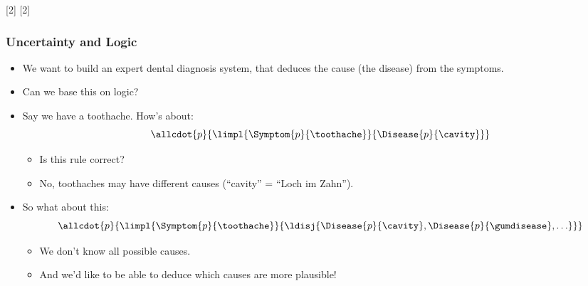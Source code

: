 \documentclass[notes,mh]{mikoslides}
\begin{document}
\begin{module}[id=uncert-logic]
[2]{\prefix{}}
[2]{\prefix{}}
 

\begin{frame}[label=slide.uncert-logic]
  \frametitle{Uncertainty and Logic}
  \begin{itemize}
  \item
    \begin{omtext}[title=Diagnosis]
      We want to build an expert dental diagnosis system, that deduces the cause (the
      disease) from the symptoms.
    \end{omtext}
  \item Can we base this on logic? \pause
  \item
    \begin{omtext}[title=Attempt 1]
      Say we have a toothache. How's about:
      \[\allcdot{p}{\limpl{\Symptom{p}{\toothache}}{\Disease{p}{\cavity}}}\]
      \begin{itemize}
      \item Is this rule correct? \pause
      \item No, toothaches may have different causes (``cavity'' = ``Loch im Zahn'').
      \end{itemize}
    \end{omtext}
  \item
    \begin{omtext}[title=Attempt 2]
      So what about this:
      \[\allcdot{p}{\limpl{\Symptom{p}{\toothache}}
          {\ldisj{\Disease{p}{\cavity},\Disease{p}{\gumdisease},\ldots}}}
      \]
      \begin{itemize}
      \item We don't know all possible causes.
      \item And we'd like to be able to deduce which causes are more plausible!
      \end{itemize}
    \end{omtext}
  \end{itemize}
\end{frame}


\end{module}
\end{document}

